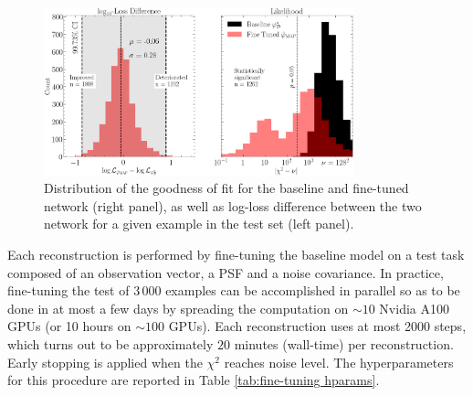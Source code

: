 \begin{figure}[thb!]
        \centering
        \includegraphics[width=0.8\textwidth]{figures/loss_and_likelihood}
        \caption{Distribution of the goodness of fit for the baseline and fine-tuned network (right panel), as well as log-loss difference between the two network for a given example in the test set (left panel).
}
        \label{fig:loss and chi squared}
\end{figure}

Each reconstruction is performed by fine-tuning the baseline model 
on a test task composed of an observation vector, a PSF and a noise covariance.
In practice, fine-tuning the test of $3\,000$ examples can be accomplished in parallel so as to be done in at most a few days by spreading the computation on $\sim 10$ Nvidia A100 GPUs (or 10 hours on $\sim 100$ GPUs). Each reconstruction uses at most 2000 steps, which turns out to be approximately $20$ minutes (wall-time) per reconstruction. Early stopping is applied when the $\chi^2$ reaches noise level. The hyperparameters for this procedure are reported in Table \ref{tab:fine-tuning hparams}.

